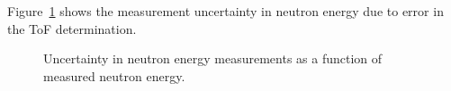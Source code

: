Figure~\ref{fig:ErgUncertainty} shows the measurement uncertainty in neutron energy due to error in the ToF determination.
\begin{figure}[]
    \caption{%
    Uncertainty in neutron energy measurements as a function of measured neutron energy.}
    \label{fig:ErgUncertainty}
\end{figure}

